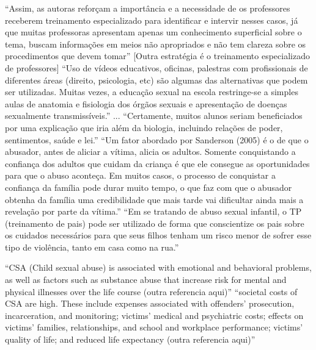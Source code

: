 ``Assim, as autoras reforçam a importância e a necessidade de os professores receberem treinamento especializado para identificar e intervir nesses casos, já que muitas professoras apresentam apenas um conhecimento superficial sobre o tema, buscam informações em meios não apropriados e não tem clareza sobre os procedimentos que devem tomar'' [Outra estratégia é o treinamento especializado de professores] ``Uso de vídeos educativos, oficinas, palestras com profissionais de diferentes áreas (direito, psicologia, etc) são algumas das alternativas que podem ser utilizadas. Muitas vezes, a educação sexual na escola restringe-se a simples aulas de anatomia e fisiologia dos órgãos sexuais e apresentação de doenças sexualmente transmissíveis.'' ... ``Certamente, muitos alunos seriam beneficiados por uma explicação que iria além da biologia, incluindo relações de poder, sentimentos, saúde e lei.'' ``Um fator abordado por Sanderson (2005) é o de que o abusador, antes de aliciar a vítima, alicia os adultos. Somente conquistando a confiança dos adultos que cuidam da criança é que ele consegue as oportunidades para que o abuso aconteça. Em muitos casos, o processo de conquistar a confiança da família pode durar muito tempo, o que faz com que o abusador obtenha da família uma credibilidade que mais tarde vai dificultar ainda mais a revelação por parte da vítima.'' ``Em se tratando de abuso sexual infantil, o TP (treinamento de pais) pode ser utilizado de forma que conscientize os pais sobre os cuidados necessários para que seus filhos tenham um risco menor de sofrer esse tipo de violência, tanto em casa como na rua.'' \cite{pelisoli2010prevenccao}


``CSA (Child sexual abuse) is associated with emotional and behavioral problems, as well as factors such as substance abuse that increase risk for mental and physical illnesses over the life course (outra referencia aqui)'' ``societal costs of CSA are high. These include expenses associated with offenders’ prosecution, incarceration, and monitoring; victims’ medical and psychiatric costs; effects on victims’ families, relationships, and school and workplace performance; victims’ quality of life; and reduced life expectancy (outra referencia aqui)'' \cite{mendelson2015parent}

